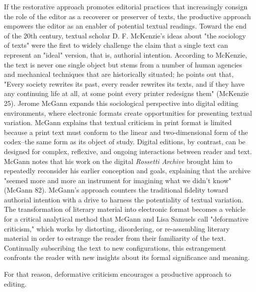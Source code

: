 \documentclass[11pt]{article}
\begin{document}
If the restorative approach promotes editorial practices that
increasingly consign the role of the editor as a recoverer or
preserver of texts, the productive approach empowers the editor as an
enabler of potential textual readings. Toward the end of the 20th
century, textual scholar D. F. McKenzie's ideas about "the sociology
of texts" were the first to widely challenge the claim that a single
text can represent an "ideal" version, that is, authorial
intention. According to McKenzie, the text is never one single object
but stems from a number of human agencies and mechanical techniques
that are historically situated; he points out that, "Every society
rewrites its past, every reader rewrites its texts, and if they have
any continuing life at all, at some point every printer redesigns
them" (McKenzie 25). Jerome McGann expands this sociological
perspective into digital editing environments, where electronic
formats create opportunities for presenting textual variation. McGann
explains that textual criticism in print format is limited because a
print text must conform to the linear and two-dimensional form of the
codex--the same form as its object of study. Digital editions, by
contrast, can be designed for complex, reflexive, and ongoing
interactions between reader and text. McGann notes that his work on
the digital \emph{Rossetti Archive} brought him to repeatedly reconsider
his earlier conception and goals, explaining that the archive "seemed
more and more an instrument for imagining what we didn't know" (McGann
82). McGann's approach counters the traditional fidelity toward
authorial intention with a drive to harness the potentiality of
textual variation. The transformation of literary material into
electronic format becomes a vehicle for a critical analytical method
that McGann and Lisa Samuels call "deformative criticism," which works
by distorting, disordering, or re-assembling literary material in
order to estrange the reader from their familiarity of the
text. Continually subscribing the text to new configurations, this
estrangement confronts the reader with new insights about its formal
significance and meaning.

For that reason, deformative criticism encourages a productive
approach to editing.
\end{document}
